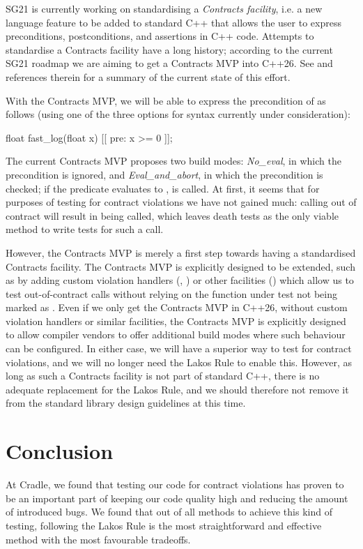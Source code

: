 SG21 is currently working on standardising a \emph{Contracts facility}, i.e. a new language feature to be added to standard C++ that allows the user to express preconditions, postconditions, and assertions in C++ code. Attempts to standardise a Contracts facility have a long history; according to the current SG21 roadmap \cite{P2695R1} we are aiming to get a Contracts MVP into C++26. See \cite{P2521R3} and references therein for a summary of the current state of this effort.

With the Contracts MVP, we will be able to express the precondition of  as follows (using one of the three options for syntax currently under consideration):
\begin{codeblock}
float fast_log(float x) [[ pre: x >= 0 ]];
\end{codeblock}

The current Contracts MVP proposes two build modes: \emph{No_eval}, in which the precondition is ignored, and \emph{Eval_and_abort}, in which the precondition is checked; if the predicate evaluates to ,  is called. At first, it seems that for purposes of testing for contract violations we have not gained much: calling  out of contract will result in  being called, which leaves death tests as the only viable method to write tests for such a call.

However, the Contracts MVP is merely a first step towards having a standardised Contracts facility. The Contracts MVP is explicitly designed to be extended, such as by adding custom violation handlers (\cite{P2698R0}, \cite{P2811R0}) or other facilities (\cite{P2784R0}) which allow us to test out-of-contract calls without relying on the function under test not being marked as . Even if we only get the Contracts MVP in C++26, without custom violation handlers or similar facilities, the Contracts MVP is explicitly designed to allow compiler vendors to offer additional build modes where such behaviour can be configured. In either case, we will have a superior way to test for contract violations, and we will no longer need the Lakos Rule to enable this. However, as long as such a Contracts facility is not part of standard C++, there is no adequate replacement for the Lakos Rule, and we should therefore not remove it from the standard library design guidelines at this time.

\section{Conclusion}
At Cradle, we found that testing our code for contract violations has proven to be an important part of keeping our code quality high and reducing the amount of introduced bugs. We found that out of all methods to achieve this kind of testing, following the Lakos Rule is the most straightforward and effective method with the most favourable tradeoffs. 

